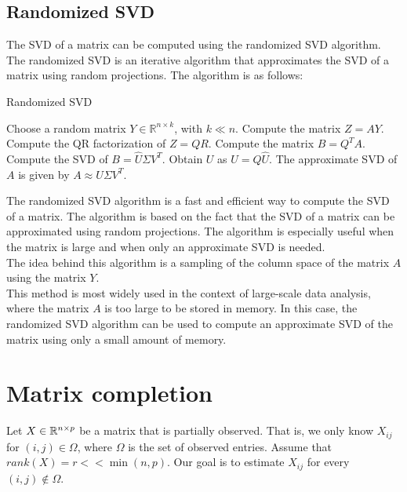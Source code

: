 \subsection{Randomized SVD}

The SVD of a matrix can be computed using the randomized SVD algorithm. The randomized SVD is an iterative algorithm
that approximates the SVD of a matrix using random projections. The algorithm is as follows:

\begin{algorithm}[H]
    \caption{Randomized SVD}
    \begin{algorithmic}[1]
        \State Choose a random matrix $Y \in \mathbb{R}^{n \times k}$, with $k \ll n$.
        \State Compute the matrix $Z = A Y$.
        \State Compute the QR factorization of $Z = Q R$.
        \State Compute the matrix $B = Q^T A$.
        \State Compute the SVD of $B = \hat{U} \Sigma V^T$.
        \State Obtain $U$ as $U = Q \hat{U}$.
        \State The approximate SVD of $A$ is given by $A \approx U \Sigma V^T$.
    \end{algorithmic}
\end{algorithm}

The randomized SVD algorithm is a fast and efficient way to compute the SVD of a matrix. The algorithm is based on the
fact that the SVD of a matrix can be approximated using random projections. The algorithm is especially useful when
the matrix is large and when only an approximate SVD is needed.\\

The idea behind this algorithm is a sampling of the column space of the matrix $A$ using the matrix $Y$.\\

This method is most widely used in the context of large-scale data analysis, where the matrix $A$ is too large to be
stored in memory. In this case, the randomized SVD algorithm can be used to compute an approximate SVD of the matrix
using only a small amount of memory.

\section{Matrix completion}

Let $X \in \mathbb{R}^{n \times p}$ be a matrix that is partially observed. That is, we only know $X_{ij}$ for
$(i,j) \in \Omega$, where $\Omega$ is the set of observed entries. Assume that $rank(X) = r << \min(n,p)$.
Our goal is to estimate $X_{ij}$ for every $(i,j) \notin \Omega$.\\

